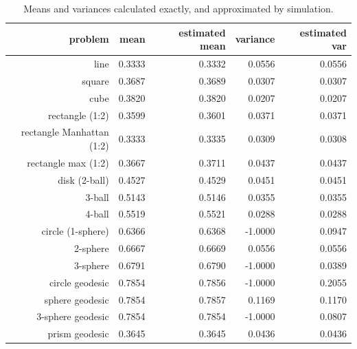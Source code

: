 \begin{table}[ht]
  \centering
  \begin{tabular}{r|rrrr}
                  problem &     mean & estimated mean & variance &  estimated var \\
     \hline 
                     line &   0.3333 &         0.3332 &   0.0556 &         0.0556 \\
                   square &   0.3687 &         0.3689 &   0.0307 &         0.0307 \\
                     cube &   0.3820 &         0.3820 &   0.0207 &         0.0207 \\
          rectangle (1:2) &   0.3599 &         0.3601 &   0.0371 &         0.0371 \\
rectangle Manhattan (1:2) &   0.3333 &         0.3335 &   0.0309 &         0.0308 \\
      rectangle max (1:2) &   0.3667 &         0.3711 &   0.0437 &         0.0437 \\
            disk (2-ball) &   0.4527 &         0.4529 &   0.0451 &         0.0451 \\
                   3-ball &   0.5143 &         0.5146 &   0.0355 &         0.0355 \\
                   4-ball &   0.5519 &         0.5521 &   0.0288 &         0.0288 \\
        circle (1-sphere) &   0.6366 &         0.6368 &  -1.0000 &         0.0947 \\
                 2-sphere &   0.6667 &         0.6669 &   0.0556 &         0.0556 \\
                 3-sphere &   0.6791 &         0.6790 &  -1.0000 &         0.0389 \\
          circle geodesic &   0.7854 &         0.7856 &  -1.0000 &         0.2055 \\
          sphere geodesic &   0.7854 &         0.7857 &   0.1169 &         0.1170 \\
        3-sphere geodesic &   0.7854 &         0.7854 &  -1.0000 &         0.0807 \\
           prism geodesic &   0.3645 &         0.3645 &   0.0436 &         0.0436 \\
  \end{tabular}
  \caption{Means and variances calculated exactly, and approximated by simulation.}
  \label{tab:mean_var_estimates}
\end{table}






